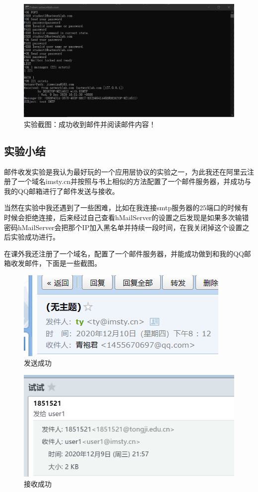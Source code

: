 \documentclass[lang=cn,11pt,a4paper,cite=authoryear]{elegantpaper}
\begin{document}
\begin{figure}[htbp]
	\centering
	\includegraphics[width=0.9\linewidth]{"image/reveive email"}
	\caption{实验截图：成功收到邮件并阅读邮件内容！}
	\label{fig:reveive-email}
\end{figure}


\subsection{实验小结}

邮件收发实验是我认为最好玩的一个应用层协议的实验之一，为此我还在阿里云注册了一个域名imsty.cn并按照与书上相似的方法配置了一个邮件服务器，并成功与我的QQ邮箱进行了邮件发送与接收。

当然在实验中我还遇到了一些困难，比如在我连接smtp服务器的25端口的时候有时候会拒绝连接，后来经过自己查看hMailServer的设置之后发现是如果多次输错密码hMailServer会把那个IP加入黑名单并持续一段时间，在我关闭掉这个设置之后实验成功进行。

在课外我还注册了一个域名，配置了一个邮件服务器，并能成功做到和我的QQ邮箱收发邮件，下面是一些截图。

\begin{figure}[htbp]
	\centering
	\includegraphics[width=0.6\linewidth]{image/screenshot046}
	\caption{发送成功}
	\label{fig:screenshot046}
\end{figure}

\begin{figure}[htbp]
	\centering
	\includegraphics[width=0.6\linewidth]{image/screenshot047}
	\caption{接收成功}
	\label{fig:screenshot047}
\end{figure}
\end{document}
